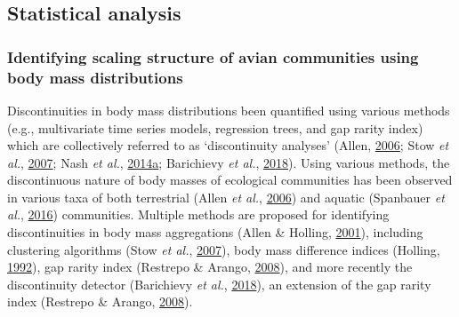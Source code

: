 \documentclass[12pt,twoside,openany]{reedthesis}
\begin{document}
\hypertarget{statistical-analysis}{%
\subsection{Statistical analysis}\label{statistical-analysis}}

\hypertarget{identifying-scaling-structure-of-avian-communities-using-body-mass-distributions}{%
\subsubsection{Identifying scaling structure of avian communities using body mass distributions}\label{identifying-scaling-structure-of-avian-communities-using-body-mass-distributions}}

Discontinuities in body mass distributions been quantified using various methods (e.g., multivariate time series models, regression trees, and gap rarity index) which are collectively referred to as `discontinuity analyses' (Allen, \protect\hyperlink{ref-allen2006discontinuities}{2006}; Stow \emph{et al.}, \protect\hyperlink{ref-stow2007evaluating}{2007}; Nash \emph{et al.}, \protect\hyperlink{ref-nash2014discontinuities}{2014}\protect\hyperlink{ref-nash2014discontinuities}{a}; Barichievy \emph{et al.}, \protect\hyperlink{ref-barichievy2018method}{2018}). Using various methods, the discontinuous nature of body masses of ecological communities has been observed in various taxa of both terrestrial (Allen \emph{et al.}, \protect\hyperlink{ref-allen2006patterns}{2006}) and aquatic (Spanbauer \emph{et al.}, \protect\hyperlink{ref-spanbauer2016body}{2016}) communities. Multiple methods are proposed for identifying discontinuities in body mass aggregations (Allen \& Holling, \protect\hyperlink{ref-allen2001cross}{2001}), including clustering algorithms (Stow \emph{et al.}, \protect\hyperlink{ref-stow2007evaluating}{2007}), body mass difference indices (Holling, \protect\hyperlink{ref-holling1992cross}{1992}), gap rarity index (Restrepo \& Arango, \protect\hyperlink{ref-restrepo2008discontinuities}{2008}), and more recently the discontinuity detector (Barichievy \emph{et al.}, \protect\hyperlink{ref-barichievy2018method}{2018}), an extension of the gap rarity index (Restrepo \& Arango, \protect\hyperlink{ref-restrepo2008discontinuities}{2008}).
\end{document}
